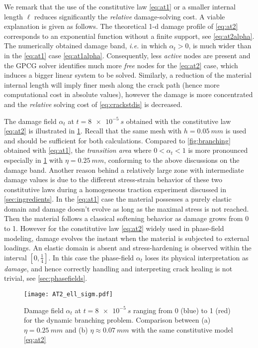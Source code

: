 We remark that the use of the constitutive law \eqref{eq:at1} or a smaller internal length $\ell$ reduces significantly the \emph{relative} damage-solving cost. A viable explanation is given as follows. The theoretical 1-d damage profile of \eqref{eq:at2} corresponds to an exponential function without a finite support, see \eqref{eq:at2alpha}. The numerically obtained damage band, \emph{i.e.} in which $\alpha_t>0$, is much wider than in the \eqref{eq:at1} case \eqref{eq:at1alpha}. Consequently, less \emph{active} nodes are present and the GPCG solver identifies much more \emph{free} nodes for the \eqref{eq:at2} case, which induces a bigger linear system to be solved. Similarly, a reduction of the material internal length will imply finer mesh along the crack path (hence more computational cost in absolute values), however the damage is more concentrated and the \emph{relative} solving cost of \eqref{eq:crackstdis} is decreased.

The damage field $\alpha_t$ at $t=\SI{8e-5}{s}$ obtained with the constitutive law \eqref{eq:at2} is illustrated in \cref{fig:at2_ell_sigm}. Recall that the same mesh with $h=\SI{0.05}{mm}$ is used and should be sufficient for both calculations. Compared to \cref{fig:branching} obtained with \eqref{eq:at1}, the \emph{transition area} where $0<\alpha_t<1$ is more pronounced especially in \cref{fig:at2_ell_sigm} with $\eta=\SI{0.25}{mm}$, conforming to the above discussions on the damage band. Another reason behind a relatively large zone with intermediate damage values is due to the different stress-strain behavior of these two constitutive laws during a homogeneous traction experiment discussed in \cref{sec:ingredients}. In the \eqref{eq:at1} case the material possesses a purely elastic domain and damage doesn't evolve as long as the maximal stress is not reached. Then the material follows a classical softening behavior as damage grows from 0 to 1. However for the constitutive law \eqref{eq:at2} widely used in phase-field modeling, damage evolves the instant when the material is subjected to external loadings. An elastic domain is absent and stress-hardening is observed within the interval $[0,\frac{1}{4}]$. In this case the phase-field $\alpha_t$ loses its physical interpretation as \emph{damage}, and hence correctly handling and interpreting crack healing is not trivial, see \cref{sec:phasefields}.
\begin{figure}[htbp]
\centering
\texttt{[image: AT2\_ell\_sigm.pdf]}
\caption{Damage field $\alpha_t$ at $t=\SI{8e-5}{s}$ ranging from 0 (blue) to 1 (red) for the dynamic branching problem. Comparison between (a) $\eta=\SI{0.25}{mm}$ and (b) $\eta\approx\SI{0.07}{mm}$ with the same constitutive model \eqref{eq:at2}} \label{fig:at2_ell_sigm}
\end{figure}

